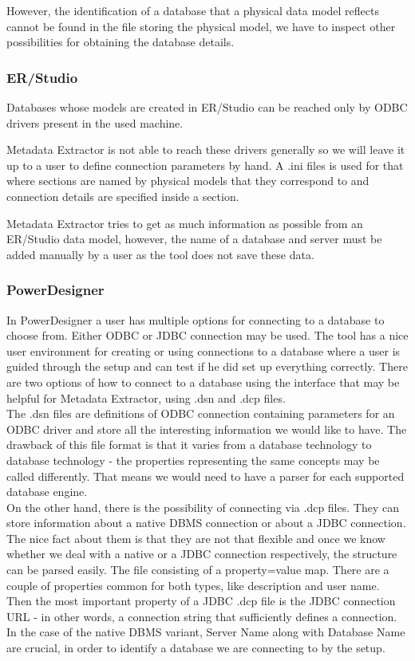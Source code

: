 However, the identification of a database that a physical data model reflects cannot be found in the file storing the physical model, we have to inspect other possibilities for obtaining the database details.

\subsubsection{ER/Studio}

Databases whose models are created in ER/Studio can be reached only by ODBC drivers present in the used machine.

Metadata Extractor is not able to reach these drivers generally so we will leave it up to a user to define connection parameters by hand.
A .ini files \label{ini_connections}is used for that where sections are named by physical models that they correspond to and connection details are specified inside a section. 

Metadata Extractor tries to get as much information as possible from an ER/Studio data model, however, the name of a database and server must be added manually by a user as the tool does not save these data.

\subsubsection{PowerDesigner}

In PowerDesigner a user has multiple options for connecting to a database to choose from. Either ODBC or JDBC connection may be used. 
The tool has a nice user environment for creating or using connections to a database where a user is guided through the setup and can test if he did set up everything correctly. 
There are two options of how to connect to a database using the interface that may be helpful for Metadata Extractor, using .dsn and .dcp files.\\

The .dsn files are definitions of ODBC connection containing parameters for an ODBC driver and store all the interesting information we would like to have. 
The drawback of this file format is that it varies from a database technology to database technology - the properties representing the same concepts may be called differently. That means we would need to have a parser for each supported database engine. \\

On the other hand, there is the possibility of connecting via .dcp files. They can store information about a native DBMS connection or about a JDBC connection. 
The nice fact about them is that they are not that flexible and once we know whether we deal with a native or a JDBC connection respectively, the structure can be parsed easily. 
The file consisting of a property=value map.
There are a couple of properties common for both types, like description and user name.
Then the most important property of a JDBC .dcp file is the JDBC connection URL - in other words, a connection string that sufficiently defines a connection.
In the case of the native DBMS variant, Server Name along with Database Name are crucial, in order to identify a database we are connecting to by the setup.

